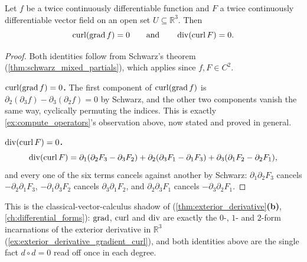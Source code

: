 \begin{proposition}[$\curl\circ\grad=0$ and $\divg\circ\curl=0$]
\label{prop:curl_grad_div_curl_zero}
Let $f$ be a twice continuously differentiable function and $F$ a twice continuously
differentiable vector field on an open set $U \subseteq \mathbb{R}^3$. Then
\[\operatorname{curl}(\operatorname{grad} f) = 0 \qquad\text{and}\qquad \operatorname{div}(\operatorname{curl} F) = 0.\]
\end{proposition}

\begin{proof}
Both identities follow from Schwarz's theorem (\cref{thm:schwarz_mixed_partials}), which
applies since $f,F \in C^2$.

\textbf{$\operatorname{curl}(\operatorname{grad} f)=0$.} The first component of $\operatorname{curl}(\operatorname{grad} f)$ is
$\partial_2(\partial_3f) - \partial_3(\partial_2f) = 0$ by Schwarz, and the other two
components vanish the same way, cyclically permuting the indices. This is exactly
\cref{ex:compute_operators}'s observation above, now stated and proved in general.

\textbf{$\operatorname{div}(\operatorname{curl} F)=0$.}
\[\operatorname{div}(\operatorname{curl} F) = \partial_1(\partial_2F_3-\partial_3F_2) + \partial_2(\partial_3F_1-\partial_1F_3)
  + \partial_3(\partial_1F_2-\partial_2F_1),\]
and every one of the six terms cancels against another by Schwarz: $\partial_1\partial_2F_3$
cancels $-\partial_2\partial_1F_3$, $-\partial_1\partial_3F_2$ cancels
$\partial_3\partial_1F_2$, and $\partial_2\partial_3F_1$ cancels $-\partial_3\partial_2F_1$.
\end{proof}

\begin{remark}
This is the classical-vector-calculus shadow of 
(\cref{thm:exterior_derivative}\textbf{(b)}, \cref{ch:differential_forms}): $\operatorname{grad}$, $\operatorname{curl}$ and
$\operatorname{div}$ are exactly the $0$-, $1$- and $2$-form incarnations of the exterior derivative in
$\mathbb{R}^3$ (\cref{ex:exterior_derivative_gradient_curl}), and both identities above are the
single fact $d\circ d=0$ read off once in each degree.
\end{remark}

